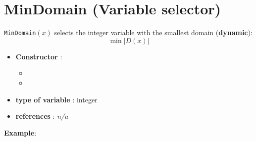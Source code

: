 \section{MinDomain (Variable selector)}\label{mindomain:mindomainvarselector}\hypertarget{mindomain:mindomainvarselector}{}
\begin{notedef}
  \texttt{MinDomain}$(x)$ selects the integer variable with the smallest domain (\textbf{dynamic}):
$$\min |D(x)|$$
\end{notedef}

\begin{itemize}
	\item \textbf{Constructor} : 
	\begin{itemize}
	\item {}
	\item {}
	\end{itemize}	
	\item \textbf{type of variable} : integer
	\item \textbf{references} : \emph{n/a}
\end{itemize}

\textbf{Example}:
%

